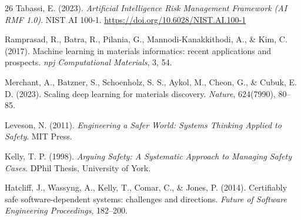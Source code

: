 \documentclass[11pt,a4paper,oneside]{report}
\begin{document}
\begin{thebibliography}{26}
Tabassi, E. (2023). \emph{Artificial Intelligence Risk Management Framework (AI RMF 1.0)}. NIST AI 100-1. \url{https://doi.org/10.6028/NIST.AI.100-1}

Ramprasad, R., Batra, R., Pilania, G., Mannodi-Kanakkithodi, A., \& Kim, C. (2017). Machine learning in materials informatics: recent applications and prospects. \emph{npj Computational Materials}, 3, 54.

Merchant, A., Batzner, S., Schoenholz, S. S., Aykol, M., Cheon, G., \& Cubuk, E. D. (2023). Scaling deep learning for materials discovery. \emph{Nature}, 624(7990), 80--85.

Leveson, N. (2011). \emph{Engineering a Safer World: Systems Thinking Applied to Safety}. MIT Press.

Kelly, T. P. (1998). \emph{Arguing Safety: A Systematic Approach to Managing Safety Cases}. DPhil Thesis, University of York.

Hatcliff, J., Wassyng, A., Kelly, T., Comar, C., \& Jones, P. (2014). Certifiably safe software-dependent systems: challenges and directions. \emph{Future of Software Engineering Proceedings}, 182--200.

\end{thebibliography}
\end{document}
